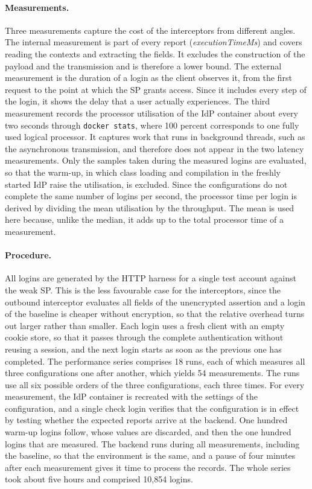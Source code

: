 \documentclass[../main.tex]{subfiles}
\begin{document}
\paragraph{Measurements.}
Three measurements capture the cost of the interceptors from different angles. 
The internal measurement is part of every report (\textit{executionTimeMs}) and covers reading the 
contexts and extracting the fields.
It excludes the construction of the payload and the transmission and is therefore a lower bound. 
The external measurement is the duration of a login as the client observes it, from the first 
request to the point at which the SP grants access. 
Since it includes every step of the login, it shows the delay that a user actually experiences. 
The third measurement records the processor utilisation of the IdP container about every two 
seconds through \texttt{docker stats}, where 100 percent corresponds to one fully used logical processor. 
It captures work that runs in background threads, such as the asynchronous transmission, and 
therefore does not appear in the two latency measurements. 
Only the samples taken during the measured logins are evaluated, so that the warm-up, in which class 
loading and compilation in the freshly started IdP raise the utilisation, is excluded. 
Since the configurations do not complete the same number of logins per second, the processor time 
per login is derived by dividing the mean utilisation by the throughput. 
The mean is used here because, unlike the median, it adds up to the total processor time of a 
measurement. 

\paragraph{Procedure.}
All logins are generated by the HTTP harness for a single test account against the weak SP. 
This is the less favourable case for the interceptors, since the outbound interceptor evaluates all 
fields of the unencrypted assertion and a login of the baseline is cheaper without encryption, so 
that the relative overhead turns out larger rather than smaller. 
Each login uses a fresh client with an empty cookie store, so that it passes through the complete 
authentication without reusing a session, and the next login starts as soon as the previous one has 
completed. 
The performance series comprises 18 runs, each of which measures all three configurations one 
after another, which yields 54 measurements. 
The runs use all six possible orders of the three configurations, each three times. 
For every measurement, the IdP container is recreated with the settings of the configuration, and 
a single check login verifies that the configuration is in effect by testing whether the expected 
reports arrive at the backend. 
One hundred warm-up logins follow, whose values are discarded, and then the one hundred logins that 
are measured. 
The backend runs during all measurements, including the baseline, so that the environment is the 
same, and a pause of four minutes after each measurement gives it time to process the records. 
The whole series took about five hours and comprised 10{,}854 logins.
\end{document}
